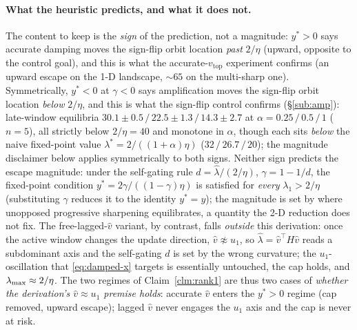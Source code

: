 \paragraph{What the heuristic predicts, and what it does not.}
The content to keep is the \emph{sign} of the prediction, not a magnitude:
$y^{*}>0$ says accurate damping moves the sign-flip orbit location
\emph{past} $2/\eta$
(upward, opposite to the control goal), and this is what the
accurate-$v_{\mathrm{top}}$ experiment confirms (an upward escape on the 1-D
landscape, $\sim\!65$ on the multi-sharp one). Symmetrically, $y^{*}<0$ at
$\gamma<0$ says amplification moves the sign-flip orbit location
\emph{below} $2/\eta$,
and this is what the sign-flip control confirms
(\S\ref{sub:amp}): late-window equilibria
$30.1\!\pm\!0.5\,/\,22.5\!\pm\!1.3\,/\,14.3\!\pm\!2.7$ at
$\alpha\!=\!0.25\,/\,0.5\,/\,1$ ($n{=}5$), all strictly below $2/\eta\!=\!40$
and monotone in $\alpha$, though each sits \emph{below} the naive
fixed-point value $\lambda^{*}\!=\!2/((1{+}\alpha)\eta)$
($32\,/\,26.7\,/\,20$); the magnitude disclaimer below applies
symmetrically to both signs. Neither sign predicts the escape magnitude: under the self-gating rule $d=\hat\lambda/(2/\eta)$,
$\gamma=1-1/d$, the fixed-point condition $y^{*}=2\gamma/((1-\gamma)\eta)$ is
satisfied for \emph{every} $\lambda_{1}>2/\eta$ (substituting $\gamma$ reduces
it to the identity $y^{*}=y$); the magnitude is set by where unopposed
progressive sharpening equilibrates, a quantity the 2-D reduction does not fix.
The free-lagged-$\hat v$ variant, by contrast, falls \emph{outside} this
derivation: once the active window changes the update direction, $\hat
v\not\approx u_{1}$, so $\hat\lambda=\hat v^{\!\top}\!H\hat v$ reads a
subdominant axis and the self-gating $d$ is set by the wrong curvature; the
$u_{1}$-oscillation that \eqref{eq:damped-x} targets is essentially untouched,
the cap holds, and $\lambda_{\max}\approx 2/\eta$. The two regimes of
Claim~\ref{clm:rank1} are thus two cases of \emph{whether the derivation's
$\hat v\approx u_{1}$ premise holds}: accurate $\hat v$ enters the $y^{*}>0$
regime (cap removed, upward escape); lagged $\hat v$ never engages the $u_{1}$
axis and the cap is never at risk.

